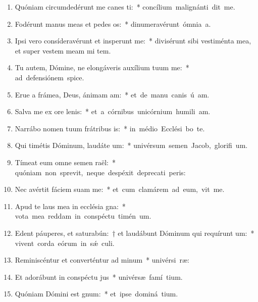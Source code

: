 \begin{flushleft}
\begin{enumerate}[leftmargin=*]
\item Quóniam circumdedérunt me canes ti:~* \mbox{concílium malignánti dit me.}
\item Fodérunt manus meas et pedes os:~* \mbox{dinumeravérunt ómnia  a.}
\item Ipsi vero consíderavérunt et insperunt me:~* divisérunt sibi vestiménta mea, et super vestem meam mi tem.
\item Tu autem, Dómine, ne elongáveris auxílium tuum  me:~* \mbox{ad defensiónem  spice.}
\item Erue a frámea, Deus, ánimam am:~* \mbox{et de manu canis ú am.}
\item Salva me ex ore lenis:~* \mbox{et a córnibus unicórnium humili am.}
\item Narrábo nomen tuum frátribus is:~* \mbox{in médio Ecclési bo te.}
\item Qui timétis Dóminum, laudáte um:~* \mbox{univérsum semen Jacob, glorifi um.}
\item Tímeat eum omne semen raël:~* \mbox{quóniam non sprevit, neque despéxit deprecati peris:}
\item Nec avértit fáciem suam  me:~* \mbox{et cum clamárem ad eum, vit me.}
\item Apud te laus mea in ecclésia gna:~* \mbox{vota mea reddam in conspéctu timén um.}
\item Edent páuperes, et saturabún:~† et laudábunt Dóminum qui requírunt um:~* \mbox{vivent corda eórum in s\'{\ae} culi.}
\item Reminiscéntur et converténtur ad minum~* \mbox{univérsi  ræ:}
\item Et adorábunt in conspéctu jus~* \mbox{univérsæ famí tium.}
\item Quóniam Dómini est gnum:~* \mbox{et ipse dominá tium.}

\end{enumerate}
\end{flushleft}
